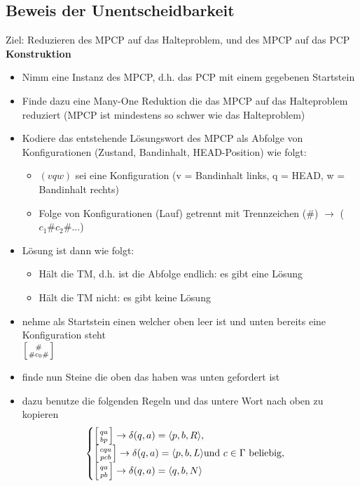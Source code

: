 \documentclass[12pt,a4paper]{article}
\begin{document}
\subsection{Beweis der Unentscheidbarkeit}
Ziel: Reduzieren des MPCP auf das Halteproblem, und des MPCP auf das PCP\\
\textbf{Konstruktion}\\
\begin{itemize}
\item Nimm eine Instanz des MPCP, d.h. das PCP mit einem gegebenen Startstein
\item Finde dazu eine Many-One Reduktion die das MPCP auf das Halteproblem reduziert (MPCP ist mindestens so schwer wie das Halteproblem)
\item Kodiere das entstehende Lösungswort des MPCP als Abfolge von Konfigurationen (Zustand, Bandinhalt, HEAD-Position) wie folgt:
\begin{itemize}
\item $(vqw)$ sei eine Konfiguration (v = Bandinhalt links, q = HEAD, w = Bandinhalt rechts)
\item Folge von Konfigurationen (Lauf) getrennt mit Trennzeichen ($\#$) $\rightarrow$ ($c_1 \# c_2  \# ...$)
\end{itemize}
\item Lösung ist dann wie folgt:
\begin{itemize}
\item Hält die TM, d.h. ist die Abfolge endlich: es gibt eine Lösung
\item Hält die TM nicht: es gibt keine Lösung
\end{itemize}
\item nehme als Startstein einen welcher oben leer ist und unten bereits eine Konfiguration steht\\
$ \left[ {\# \atop \# c_0 \#} \right]$
\item finde nun Steine die oben das haben was unten gefordert ist
\item dazu benutze die folgenden Regeln und das untere Wort nach oben zu kopieren$$
\begin{cases}
\left[ {qa \atop bp} \right] \rightarrow \delta(q,a) = \langle p,b,R \rangle,\\
\left[ {cqa \atop pcb} \right] \rightarrow \delta(q,a) = \langle p,b,L \rangle \text{und $c \in \Gamma$ beliebig},\\
\left[ {qa \atop pb} \right] \rightarrow \delta(q,a) = \langle q,b,N \rangle\\
\end{cases}
$$
\end{itemize}
\end{document}
